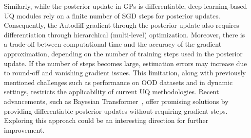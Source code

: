 Similarly, while the posterior update in GPs is differentiable, 
  deep learning-based UQ modules rely on a finite number of SGD steps for posterior updates.
Consequently, the Autodiff gradient through the posterior update  also requires differentiation through hierarchical (multi-level) optimization. Moreover, there is a trade-off between computational time
and the accuracy of the gradient approximation, depending on the number of training steps used in the posterior update. 
If the number of steps becomes large, estimation errors may increase due to round-off and vanishing gradient issues. 
This limitation, along with previously mentioned challenges such as performance on OOD datasets and in dynamic settings, 
restricts the applicability of 
current UQ methodologies.
Recent advancements, such as Bayesian 
Transformer~\citep{NguyenGr22, MullerHoArGrHu22}, 
offer
promising solutions by providing differentiable posterior updates 
without requiring gradient steps. 
Exploring this approach could be an interesting direction for further improvement.
